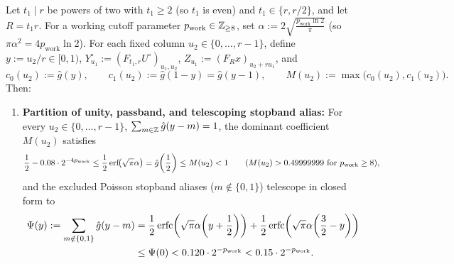 \begin{theorem}\label{thm:deconv}
Let $t_1 \mid r$ be powers of two with $t_1 \ge 2$ (so $t_1$ is even) and $t_1 \in \{r, r/2\}$, and let $R = t_1 r$. For a working cutoff parameter $p_{\mathrm{work}} \in \mathbb{Z}_{\ge 8}$, set $\alpha := 2\sqrt{\frac{p_{\mathrm{work}} \ln 2}{\pi}}$ (so $\pi \alpha^2 = 4 p_{\mathrm{work}} \ln 2$). For each fixed column $u_2 \in \{0, \dots, r-1\}$, define $y := u_2 / r \in [0, 1)$, $Y^\circ_{u_1} := (F_{t_1, r} U^\circ)_{u_1, u_2}$, $Z_{u_1} := (F_R x)_{u_2 + r u_1}$, and
\begin{equation}\label{eq:c0-c1}
  c_0(u_2) := \hat{g}(y), \qquad c_1(u_2) := \hat{g}(1 - y) = \hat{g}(y - 1), \qquad M(u_2) := \max\bigl(c_0(u_2), c_1(u_2)\bigr).
\end{equation}
Then:
\begin{enumerate}[label=\textbf{\arabic*.},leftmargin=*]
  \item \textbf{Partition of unity, passband, and telescoping stopband alias:} For every $u_2 \in \{0, \dots, r-1\}$, $\sum_{m \in \mathbb{Z}} \hat{g}(y - m) = 1$, the dominant coefficient $M(u_2)$ satisfies
  \begin{equation}\label{eq:passband}
    \frac{1}{2} - 0.08 \cdot 2^{-4 p_{\mathrm{work}}} \le \frac{1}{2}\operatorname{erf}\!\bigl(\sqrt{\pi}\alpha\bigr) = \hat{g}\!\left(\frac{1}{2}\right) \le M(u_2) < 1 \qquad (M(u_2) > 0.49999999 \text{ for } p_{\mathrm{work}} \ge 8),
  \end{equation}
  and the excluded Poisson stopband aliases ($m \notin \{0, 1\}$) telescope in closed form to
  \begin{equation}\label{eq:stopband}
    \begin{aligned}
      \Psi(y) := \sum_{m \notin \{0, 1\}} \hat{g}(y - m)
      &= \frac{1}{2}\operatorname{erfc}\!\left(\sqrt{\pi}\alpha\!\left(y + \frac{1}{2}\right)\right) + \frac{1}{2}\operatorname{erfc}\!\left(\sqrt{\pi}\alpha\!\left(\frac{3}{2} - y\right)\right) \\
      &\le \Psi(0) < 0.120 \cdot 2^{-p_{\mathrm{work}}} < 0.15 \cdot 2^{-p_{\mathrm{work}}}.
    \end{aligned}
  \end{equation}


\end{enumerate}
\end{theorem}
